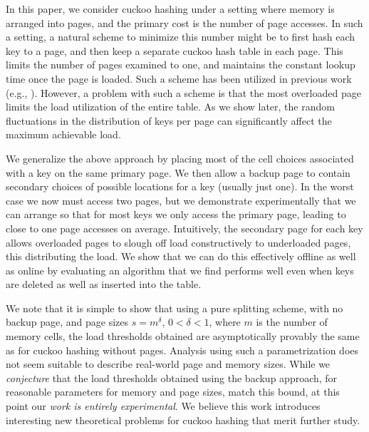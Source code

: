 \let\accentvec\vec \documentclass{llncs}
\newcommand{\eg}{e.g.}
\begin{document}
In this paper, we consider cuckoo hashing under a setting where memory
is arranged into pages, and the primary cost is the number of
page accesses.  In such a setting, a natural scheme to minimize this
number might be to first hash each key to a page, and
then keep a separate cuckoo hash table in each page.  This limits the
number of pages examined to one, and maintains the constant lookup
time once the page is loaded.  Such a scheme has been utilized in
previous work (\eg, \cite{alcantara2009real}).  However, a problem
with such a scheme is that the most overloaded page limits the load
utilization of the entire table.  As we show later, the random
fluctuations in the distribution of keys per page can significantly
affect the maximum achievable load.

We generalize the above approach by placing most of the cell choices
associated with a key on the same primary page.  We then allow a
backup page to contain secondary choices of possible locations for a
key (usually just one).  In the worst case we now must access two
pages, but we demonstrate experimentally that we can arrange so that
for most keys we only access the primary page, leading to close to one page
accesses on average.  Intuitively, the secondary page for each key
allows overloaded pages to slough off load constructively to
underloaded pages, this distributing the load.  We show that we
can do this effectively offline as well as online by evaluating an
algorithm that we find performs well even when keys are deleted as
well as inserted into the table.

We note that it is simple to show that using a pure splitting scheme,
with no backup page, and page sizes $s=m^\delta$, $0<\delta<1$, where
$m$ is the number of memory cells, the load thresholds obtained are
asymptotically provably the same as for cuckoo hashing without pages.
Analysis using such a parametrization does not seem suitable to
describe real-world page and memory sizes.  While we \emph{conjecture}
that the load thresholds obtained using the backup approach, for
reasonable parameters for memory and page sizes, match this bound, at
this point our \emph{work is entirely experimental}.  We believe this
work introduces interesting new theoretical problems for cuckoo
hashing that merit further study.
\end{document}
